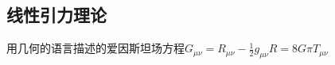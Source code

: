 
\begin{issues}
\issueMissDepend
\issueDraft
\end{issues}



\subsection{线性引力理论}
用几何的语言描述的爱因斯坦场方程$ G_{\mu \nu} = R_{\mu \nu} - \frac{1}{2}g_{\mu\nu}R = 8 G\pi T_{\mu\nu}$